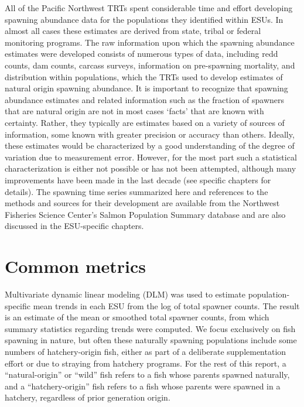\documentclass[
  letterpaper,
  oneside,
  open=any]{scrbook}
\begin{document}
All of the Pacific Northwest TRTs spent considerable time and effort
developing spawning abundance data for the populations they identified
within ESUs. In almost all cases these estimates are derived from state,
tribal or federal monitoring programs. The raw information upon which
the spawning abundance estimates were developed consists of numerous
types of data, including redd counts, dam counts, carcass surveys,
information on pre-spawning mortality, and distribution within
populations, which the TRTs used to develop estimates of natural origin
spawning abundance. It is important to recognize that spawning abundance
estimates and related information such as the fraction of spawners that
are natural origin are not in most cases `facts' that are known with
certainty. Rather, they typically are estimates based on a variety of
sources of information, some known with greater precision or accuracy
than others. Ideally, these estimates would be characterized by a good
understanding of the degree of variation due to measurement error.
However, for the most part such a statistical characterization is either
not possible or has not been attempted, although many improvements have
been made in the last decade (see specific chapters for details). The
spawning time series summarized here and references to the methods and
sources for their development are available from the Northwest Fisheries
Science Center's Salmon Population Summary database and are also
discussed in the ESU-specific chapters.

\hypertarget{common-metrics}{%
\section{Common metrics}\label{common-metrics}}

Multivariate dynamic linear modeling (DLM) was used to estimate
population-specific mean trends in each ESU from the log of total
spawner counts. The result is an estimate of the mean or smoothed total
spawner counts, from which summary statistics regarding trends were
computed. We focus exclusively on fish spawning in nature, but often
these naturally spawning populations include some numbers of
hatchery-origin fish, either as part of a deliberate supplementation
effort or due to straying from hatchery programs. For the rest of this
report, a ``natural-origin'' or ``wild'' fish refers to a fish whose
parents spawned naturally, and a ``hatchery-origin'' fish refers to a
fish whose parents were spawned in a hatchery, regardless of prior
generation origin.
\end{document}
